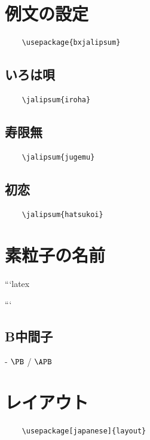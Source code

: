 \documentclass[
    article,
    head_space=25truemm,
    foot_space=10truemm,
    gutter=15truemm]{jlreq}
\begin{document}
\section{例文の設定}

\begin{verbatim}
    \usepackage{bxjalipsum}
\end{verbatim}

\subsection{いろは唄}

\begin{verbatim}
    \jalipsum{iroha}
\end{verbatim}

\subsection{寿限無}

\begin{verbatim}
    \jalipsum{jugemu}
\end{verbatim}

\subsection{初恋}

\begin{verbatim}
    \jalipsum{hatsukoi}
\end{verbatim}

\section{素粒子の名前}

\begin{markdown}
```latex
\usepackage[italic]{hepnames}
```
\end{markdown}

\subsection{B中間子}

\begin{markdown}
- $\PB$ / $\APB$
\end{markdown}

\section{レイアウト}

\begin{verbatim}
    \usepackage[japanese]{layout}
\end{verbatim}

\centering
\layout

\printbibliography[title={参考文献}]
\end{document}
